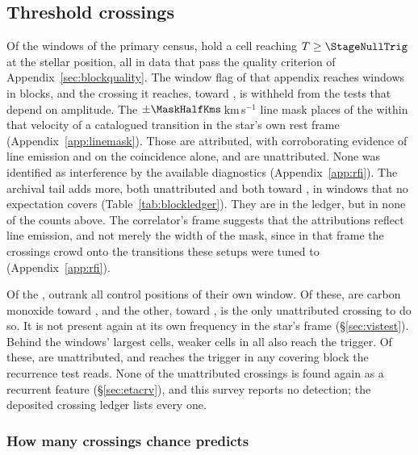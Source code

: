 \subsection{Threshold crossings}
\label{sec:technosearch}

Of the \NWindows{} windows of the primary census, \CsNCross{} hold a cell
reaching $T\geq\StageNullTrig$ at the stellar position, all in data that pass
the quality criterion of Appendix~\ref{sec:blockquality}. The window flag of
that appendix reaches \DqNWin{} windows in \BkFlagNBlock{} blocks, and the
\BkFlagNCrossOtherWord{} crossing it reaches, toward \BkFlagOtherStar, is
withheld from the tests that depend on amplitude. The
$\pm\MaskHalfKms$\,km\,s$^{-1}$ line mask places \MkNCoinc{} of the
\CsNCrossQp{} within that velocity of a catalogued transition in the star's
own rest frame (Appendix~\ref{app:linemask}). Those \CsNAttrQp{} are
attributed, \LnAttrSupp{} with corroborating evidence of line emission and
\LnAttrCoinc{} on the coincidence alone, and \CsNUnattrQp{} are
unattributed. None was identified as interference by the available
diagnostics (Appendix~\ref{app:rfi}). The archival tail adds
\CeNTailCrossWord{} more, both unattributed and both toward \CeTailStar, in
windows that no expectation covers (Table~\ref{tab:blockledger}). They are in
the ledger, but in none of the counts above. The correlator's frame
suggests that the attributions reflect line emission, and not merely the
width of the mask, since in that frame the crossings crowd onto the
transitions these setups were tuned to (Appendix~\ref{app:rfi}).

Of the \CsNCrossQp, \LrStageN{} outrank all \NCtrl{} control positions of
their own window. Of these, \LrStageNCo{} are carbon monoxide toward
\LrStageCoStars, and the other, toward \EvAStar, is the only unattributed
crossing to do so. It is not present again at its own frequency in the
star's frame (\S\ref{sec:vistest}). Behind the
windows' largest cells, \CkNSecondaryWord{} weaker cells in all also reach the
trigger. Of these, \CkNSecUnattrWord{} are unattributed, and \CkNRecurWord{} reaches the
trigger in any covering block the recurrence test reads. None of the unattributed
crossings is found again as a recurrent feature (\S\ref{sec:etacrv}), and
this survey reports no detection; the deposited crossing ledger lists every
one.

\subsubsection{How many crossings chance predicts}
\label{sec:trigunif}

